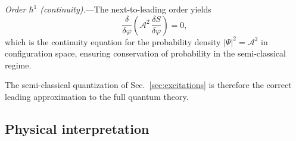 \documentclass[aps,prd,onecolumn,superscriptaddress,nofootinbib,showpacs,12pt,notitlepage]{revtex4-2}
\begin{document}
\textit{Order $\hbar^1$ (continuity).}---The
next-to-leading order yields
\begin{equation}\label{eq:continuity}
  \frac{\delta}{\delta\varphi}\!\left(
    \mathcal{A}^2\,\frac{\delta S}{\delta\varphi}
  \right) = 0,
\end{equation}
which is the continuity equation for the probability
density $|\Psi|^2 = \mathcal{A}^2$ in configuration
space, ensuring conservation of probability in the
semi-classical regime.

The semi-classical quantization of
Sec.~\ref{sec:excitations} is therefore the correct
leading approximation to the full quantum theory.

\subsection{Physical interpretation}
\label{sec:physical_interp}
\end{document}

